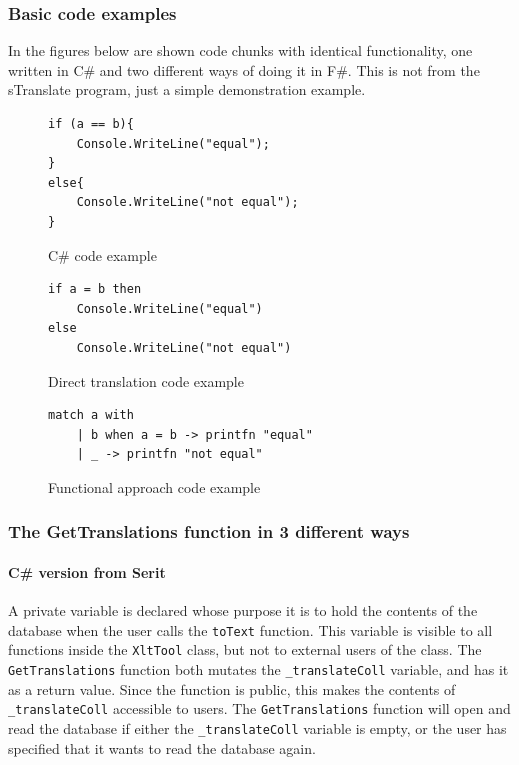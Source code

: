 \documentclass[12pt, a4paper]{article}
\newcommand{\code}[1]{{\small \texttt{#1}}}
\begin{document}
\newpage

\subsubsection{Basic code examples}
In the figures below are shown code chunks with identical functionality, one written in C\# and two different ways of doing it in F\#. This is not from the sTranslate program, just a simple demonstration example.

\begin{figure}[!h]
\begin{lstlisting}
if (a == b){
	Console.WriteLine("equal");
}
else{
	Console.WriteLine("not equal");
}
\end{lstlisting}
\caption{C\# code example}
\label{fig:CSharpIf}
\end{figure}

\begin{figure}[!h]
\begin{lstlisting}
if a = b then 
	Console.WriteLine("equal")
else 
	Console.WriteLine("not equal")
\end{lstlisting}
\caption{Direct translation code example}
\label{fig:directTranslationIf}
\end{figure}

\begin{figure}[!h]
\begin{lstlisting}
match a with
    | b when a = b -> printfn "equal"
    | _ -> printfn "not equal"
\end{lstlisting}
\caption{Functional approach code example}
\label{fig:functionalApproachIf}
\end{figure}

\newpage


\subsubsection{The GetTranslations function in 3 different ways}
\paragraph{C\# version from Serit} A private variable is declared whose purpose it is to hold the contents of the database when the user calls the \code{toText} function. This variable is visible to all functions inside the \code{XltTool} class, but not to external users of the class. The \code{GetTranslations} function both mutates the \code{\_translateColl} variable, and has it as a return value. Since the function is public, this makes the contents of \code{\_translateColl} accessible to users. The \code{GetTranslations} function will open and read the database if either the \code{\_translateColl} variable is empty, or the user has specified that it wants to read the database again.
\end{document}
